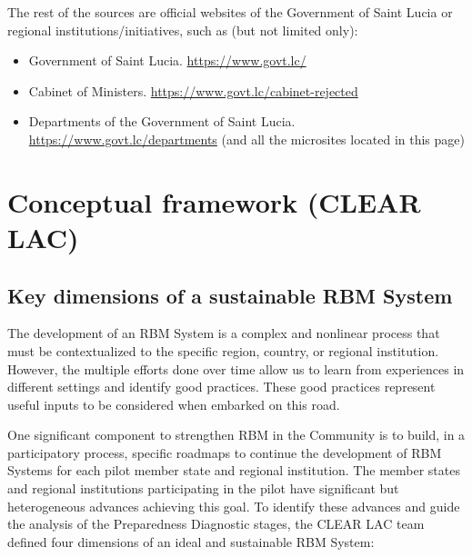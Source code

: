 \documentclass[
  10pt,
]{book}
\begin{document}
The rest of the sources are official websites of the Government of Saint Lucia or regional institutions/initiatives, such as (but not limited only):

\begin{itemize}
\item
  Government of Saint Lucia. \url{https://www.govt.lc/}
\item
  Cabinet of Ministers. \url{https://www.govt.lc/cabinet-rejected}
\item
  Departments of the Government of Saint Lucia. \url{https://www.govt.lc/departments} (and all the microsites located in this page)
\end{itemize}

\hypertarget{appendix-appendix}{%
\appendix}


\hypertarget{appendixA}{%
\chapter{Conceptual framework (CLEAR LAC)}\label{appendixA}}

\hypertarget{key-dimensions-of-a-sustainable-rbm-system}{%
\section{Key dimensions of a sustainable RBM System}\label{key-dimensions-of-a-sustainable-rbm-system}}

The development of an RBM System is a complex and nonlinear process that must be contextualized to the specific region, country, or regional institution. However, the multiple efforts done over time allow us to learn from experiences in different settings and identify good practices. These good practices represent useful inputs to be considered when embarked on this road.

One significant component to strengthen RBM in the Community is to build, in a participatory process, specific roadmaps to continue the development of RBM Systems for each pilot member state and regional institution. The member states and regional institutions participating in the pilot have significant but heterogeneous advances achieving this goal. To identify these advances and guide the analysis of the Preparedness Diagnostic stages, the CLEAR LAC team defined four dimensions of an ideal and sustainable RBM System:
\end{document}
